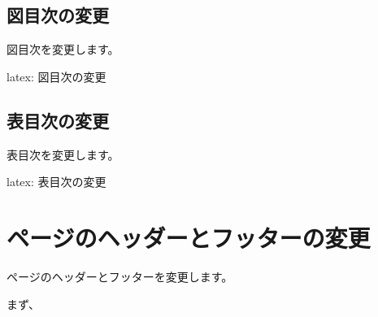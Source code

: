 \documentclass[dvipdfmx,a4j,14pt,uplatex,openany]{jsbook}
\begin{document}
\subsection{図目次の変更}
\label{sec:org8b7dda2}
図目次を変更します。

\begin{programlist}[label={org2b8fb4a}]{latex}{: 図目次の変更}%
\renewcommand{\listoffigures}{%
  \if@twocolumn\@restonecoltrue\onecolumn
  \else\@restonecolfalse\fi
  \section*{\listfigurename %
    \@mkboth{\listfigurename}{\listfigurename}%
      \pdfbookmark{\listfigurename}{listoffigures}}%
  \@starttoc{lof}%
  \if@restonecol\twocolumn\fi
}
\end{programlist}

\subsection{表目次の変更}
\label{sec:orgbd26888}
表目次を変更します。

\begin{programlist}[label={orgaedc5e0}]{latex}{: 表目次の変更}%
\renewcommand{\listoftables}{%
  \if@twocolumn\@restonecoltrue\onecolumn
  \else\@restonecolfalse\fi
  \section*{\listtablename %
  \@mkboth{\listtablename}{\listtablename}%
  \pdfbookmark{\listtablename}{listoftables}}%
  \@starttoc{lot}%
  \if@restonecol\twocolumn\fi
}
\end{programlist}

\section{ページのヘッダーとフッターの変更}
\label{sec:org05e3472}
ページのヘッダーとフッターを変更します。


まず、

\tcbox[colback=white,colframe=red,size=small,on line]{
  \textcolor{red}{\sffamily \bfseries 部外秘}
  }
\end{document}
